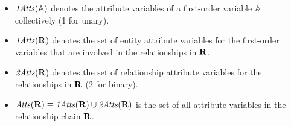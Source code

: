\documentclass{acm_proc_article-sp}
\begin{document}
\begin{itemize}
\item  $\it{1Atts}(\mathbb{A})$ denotes the attribute variables of a first-order variable $\mathbb{A}$ collectively (1 for unary).
\item $\it{1Atts}(\mathbf{R})$ denotes the set of entity attribute variables for the first-order variables that are involved in the relationships in $\mathbf{R}$. 
\item $\it{2Atts}(\mathbf{R})$ denotes the set of relationship attribute variables for %
the relationships in $\mathbf{R}$ (2 for binary).
\item $\it{Atts}(\mathbf{R}) \equiv \it{1Atts}(\mathbf{R}) \cup \it{2Atts}(\mathbf{R})$ is the set of all attribute variables in the relationship chain $\mathbf{R}$.

\end{itemize}
\end{document}
